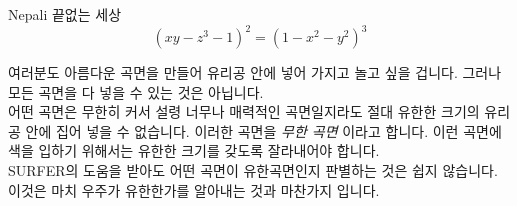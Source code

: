 \begin{surferPage}{Nepali}
끝없는 세상 \\
\smallskip
\[(x y - z^3 -1)^2= (1 - x^2	- y^2)^3\]

\singlespacing
여러분도 아름다운 곡면을 만들어 유리공 안에 넣어 가지고 놀고 싶을 겁니다. 그러나 모든 곡면을 다 넣을 수 있는  것은 아닙니다.
\\
\singlespacing
어떤 곡면은 무한히 커서 설령 너무나 매력적인 곡면일지라도 절대 유한한 크기의 유리공 안에 집어 넣을 수 없습니다. 이러한 곡면을 \textit{무한 곡면} 이라고 합니다. 이런 곡면에 색을 입하기 위해서는 유한한 크기를 갖도록 잘라내어야 합니다. 
\\
\singlespacing
SURFER의 도움을 받아도 어떤 곡면이 유한곡면인지 판별하는 것은 쉽지 않습니다. 이것은 마치 우주가 유한한가를 알아내는 것과 마찬가지 입니다.
\end{surferPage}
